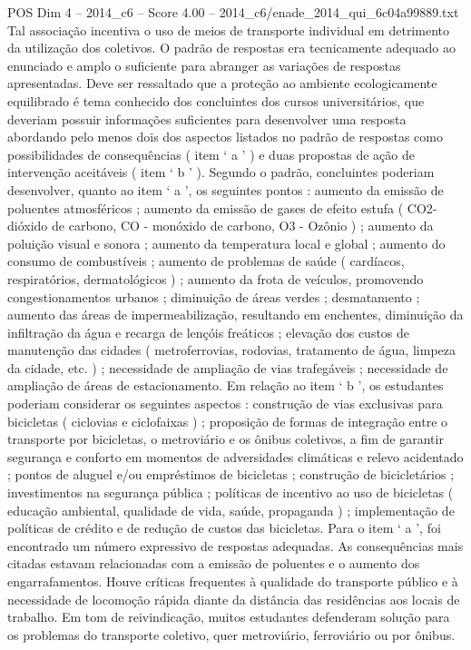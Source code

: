 \begin{textsample}{POS Dim 4 – 2014\_c6 – Score 4.00 – 2014\_c6/enade\_2014\_qui\_6c04a99889.txt}
Tal associação incentiva o uso de meios de transporte individual em detrimento da utilização dos coletivos.
O padrão de respostas era tecnicamente adequado ao enunciado e amplo o suficiente para abranger as variações de respostas apresentadas.
Deve ser ressaltado que a proteção ao ambiente ecologicamente equilibrado é tema conhecido dos concluintes dos cursos universitários, que deveriam possuir informações suficientes para desenvolver uma resposta abordando pelo menos dois dos aspectos listados no padrão de respostas como possibilidades de consequências ( item ‘ a ’ ) e duas propostas de ação de intervenção aceitáveis ( item ‘ b ’ ).
Segundo o padrão, concluintes poderiam desenvolver, quanto ao item ‘ a ’, os seguintes pontos : aumento da emissão de poluentes atmosféricos ; aumento da emissão de gases de efeito estufa ( CO2- dióxido de carbono, CO - monóxido de carbono, O3 - Ozônio ) ; aumento da poluição visual e sonora ; aumento da temperatura local e global ; aumento do consumo de combustíveis ; aumento de problemas de saúde ( cardíacos, respiratórios, dermatológicos ) ; aumento da frota de veículos, promovendo congestionamentos urbanos ; diminuição de áreas verdes ; desmatamento ; aumento das áreas de impermeabilização, resultando em enchentes, diminuição da infiltração da água e recarga de lençóis freáticos ; elevação dos custos de manutenção das cidades ( metroferrovias, rodovias, tratamento de água, limpeza da cidade, etc. ) ; necessidade de ampliação de vias trafegáveis ; necessidade de ampliação de áreas de estacionamento.
Em relação ao item ‘ b ’, os estudantes poderiam considerar os seguintes aspectos : construção de vias exclusivas para bicicletas ( ciclovias e ciclofaixas ) ; proposição de formas de integração entre o transporte por bicicletas, o metroviário e os ônibus coletivos, a fim de garantir segurança e conforto em momentos de adversidades climáticas e relevo acidentado ; pontos de aluguel e/ou empréstimos de bicicletas ; construção de bicicletários ; investimentos na segurança pública ; políticas de incentivo ao uso de bicicletas ( educação ambiental, qualidade de vida, saúde, propaganda ) ; implementação de políticas de crédito e de redução de custos das bicicletas.
Para o item ‘ a ’, foi encontrado um número expressivo de respostas adequadas.
As consequências mais citadas estavam relacionadas com a emissão de poluentes e o aumento dos engarrafamentos.
Houve críticas frequentes à qualidade do transporte público e à necessidade de locomoção rápida diante da distância das residências aos locais de trabalho.
Em tom de reivindicação, muitos estudantes defenderam solução para os problemas do transporte coletivo, quer metroviário, ferroviário ou por ônibus.

\end{textsample}
